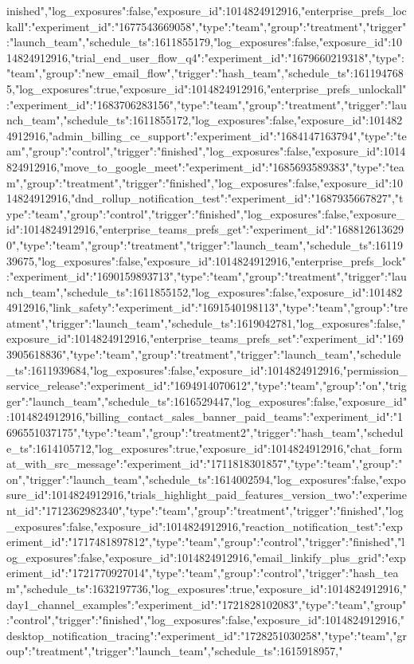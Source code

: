 {inished","log_exposures":false,"exposure_id":1014824912916},"enterprise_prefs_lockall":{"experiment_id":"1677543669058","type":"team","group":"treatment","trigger":"launch_team","schedule_ts":1611855179,"log_exposures":false,"exposure_id":1014824912916},"trial_end_user_flow_q4":{"experiment_id":"1679660219318","type":"team","group":"new_email_flow","trigger":"hash_team","schedule_ts":1611947685,"log_exposures":true,"exposure_id":1014824912916},"enterprise_prefs_unlockall":{"experiment_id":"1683706283156","type":"team","group":"treatment","trigger":"launch_team","schedule_ts":1611855172,"log_exposures":false,"exposure_id":1014824912916},"admin_billing_ce_support":{"experiment_id":"1684147163794","type":"team","group":"control","trigger":"finished","log_exposures":false,"exposure_id":1014824912916},"move_to_google_meet":{"experiment_id":"1685693589383","type":"team","group":"treatment","trigger":"finished","log_exposures":false,"exposure_id":1014824912916},"dnd_rollup_notification_test":{"experiment_id":"1687935667827","type":"team","group":"control","trigger":"finished","log_exposures":false,"exposure_id":1014824912916},"enterprise_teams_prefs_get":{"experiment_id":"1688126136290","type":"team","group":"treatment","trigger":"launch_team","schedule_ts":1611939675,"log_exposures":false,"exposure_id":1014824912916},"enterprise_prefs_lock":{"experiment_id":"1690159893713","type":"team","group":"treatment","trigger":"launch_team","schedule_ts":1611855152,"log_exposures":false,"exposure_id":1014824912916},"link_safety":{"experiment_id":"1691540198113","type":"team","group":"treatment","trigger":"launch_team","schedule_ts":1619042781,"log_exposures":false,"exposure_id":1014824912916},"enterprise_teams_prefs_set":{"experiment_id":"1693905618836","type":"team","group":"treatment","trigger":"launch_team","schedule_ts":1611939684,"log_exposures":false,"exposure_id":1014824912916},"permission_service_release":{"experiment_id":"1694914070612","type":"team","group":"on","trigger":"launch_team","schedule_ts":1616529447,"log_exposures":false,"exposure_id":1014824912916},"billing_contact_sales_banner_paid_teams":{"experiment_id":"1696551037175","type":"team","group":"treatment2","trigger":"hash_team","schedule_ts":1614105712,"log_exposures":true,"exposure_id":1014824912916},"chat_format_with_src_message":{"experiment_id":"1711818301857","type":"team","group":"on","trigger":"launch_team","schedule_ts":1614002594,"log_exposures":false,"exposure_id":1014824912916},"trials_highlight_paid_features_version_two":{"experiment_id":"1712362982340","type":"team","group":"treatment","trigger":"finished","log_exposures":false,"exposure_id":1014824912916},"reaction_notification_test":{"experiment_id":"1717481897812","type":"team","group":"control","trigger":"finished","log_exposures":false,"exposure_id":1014824912916},"email_linkify_plus_grid":{"experiment_id":"1721770927014","type":"team","group":"control","trigger":"hash_team","schedule_ts":1632197736,"log_exposures":true,"exposure_id":1014824912916},"day1_channel_examples":{"experiment_id":"1721828102083","type":"team","group":"control","trigger":"finished","log_exposures":false,"exposure_id":1014824912916},"desktop_notification_tracing":{"experiment_id":"1728251030258","type":"team","group":"treatment","trigger":"launch_team","schedule_ts":1615918957,"}
